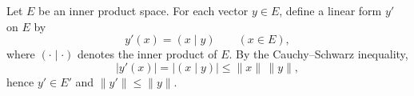 Let $E$ be an inner product space. For each vector $y \in E$, define a linear form $y'$ on $E$ by
$$y'(x) = (x \mid y) \qquad (x \in E),$$
where $(\cdot \mid \cdot)$ denotes the inner product of $E$. By the Cauchy--Schwarz inequality,
$$|y'(x)| = |(x \mid y)| \leq \|x\| \, \|y\|,$$
hence $y' \in E'$ and $\|y'\| \leq \|y\|$.

